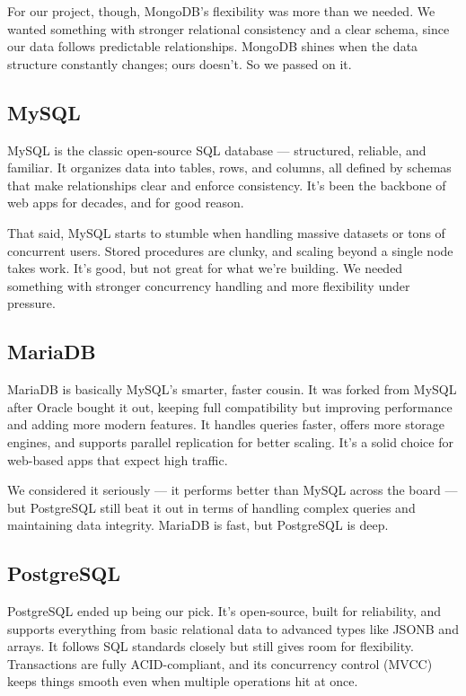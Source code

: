 \documentclass[12pt]{article}
\begin{document}
For our project, though, MongoDB’s flexibility was more than we needed. We wanted something with stronger relational consistency and a clear schema, since our data follows predictable relationships. MongoDB shines when the data structure constantly changes; ours doesn’t. So we passed on it.

\subsection{MySQL}
MySQL is the classic open-source SQL database — structured, reliable, and familiar. It organizes data into tables, rows, and columns, all defined by schemas that make relationships clear and enforce consistency. It’s been the backbone of web apps for decades, and for good reason.

That said, MySQL starts to stumble when handling massive datasets or tons of concurrent users. Stored procedures are clunky, and scaling beyond a single node takes work. It’s good, but not great for what we’re building. We needed something with stronger concurrency handling and more flexibility under pressure.

\subsection{MariaDB}
MariaDB is basically MySQL’s smarter, faster cousin. It was forked from MySQL after Oracle bought it out, keeping full compatibility but improving performance and adding more modern features. It handles queries faster, offers more storage engines, and supports parallel replication for better scaling. It’s a solid choice for web-based apps that expect high traffic.

We considered it seriously — it performs better than MySQL across the board — but PostgreSQL still beat it out in terms of handling complex queries and maintaining data integrity. MariaDB is fast, but PostgreSQL is deep.

\subsection{PostgreSQL}
PostgreSQL ended up being our pick. It’s open-source, built for reliability, and supports everything from basic relational data to advanced types like JSONB and arrays. It follows SQL standards closely but still gives room for flexibility. Transactions are fully ACID-compliant, and its concurrency control (MVCC) keeps things smooth even when multiple operations hit at once.
\end{document}
